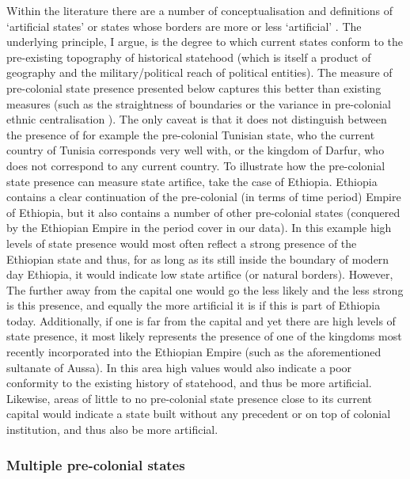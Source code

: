 \documentclass[12pt]{article}
\begin{document}
\begin{multicols}{2}
Within the literature there are a number of conceptualisation and definitions of
`artificial states' or states whose borders are more or less `artificial'
\citep{Alesina2011, Clapham1996, Englebert2002, Herbst2014}. The underlying
principle, I argue, is the degree to which current states conform to the
pre-existing topography of historical statehood (which is itself a product of
geography and the military/political reach of political entities). The measure
of pre-colonial state presence presented below captures this better than
existing measures (such as the straightness of boundaries \citep{Alesina2011} or
the variance in pre-colonial ethnic centralisation \citep{Englebert2002}). The
only caveat is that it does not distinguish between the presence of for example
the pre-colonial Tunisian state, who the current country of Tunisia corresponds
very well with, or the kingdom of Darfur, who does not correspond to any current
country. To illustrate how the pre-colonial state presence can measure state
artifice, take the case of Ethiopia. Ethiopia contains a clear continuation of
the pre-colonial (in terms of time period) Empire of Ethiopia, but it also
contains a number of other pre-colonial states (conquered by the Ethiopian
Empire in the period cover in our data). In this example high levels of state
presence would most often reflect a strong presence of the Ethiopian state and
thus, for as long as its still inside the boundary of modern day Ethiopia, it
would indicate low state artifice (or natural borders). However, The further
away from the capital one would go the less likely and the less strong is this
presence, and equally the more artificial it is if this is part of Ethiopia
today. Additionally, if one is far from the capital and yet there are high
levels of state presence, it most likely represents the presence of one of the
kingdoms most recently incorporated into the Ethiopian Empire (such as the
aforementioned sultanate of Aussa). In this area high values would also indicate
a poor conformity to the existing history of statehood, and thus be more
artificial.  Likewise, areas of little to no pre-colonial state presence close
to its current capital would indicate a state built without any precedent or on
top of colonial institution, and thus also be more artificial. 

\subsubsection{Multiple pre-colonial states}


\end{multicols}
\end{document}
